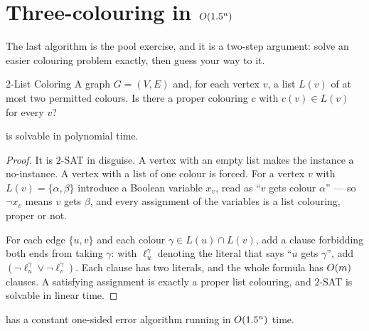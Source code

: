 \section{Three-colouring in \texorpdfstring{$O\!\left(1.5^n\right)$}{O(1.5 to the n)}}
\label{sec:randomized-3col}

The last algorithm is the pool exercise, and it is a two-step argument: solve an
easier colouring problem exactly, then guess your way to it.

\begin{probdef}{2-List Coloring}
  \instance A graph $G = (V,E)$ and, for each vertex $v$, a list
  $L(v)$ of at most two permitted colours.
  \question Is there a proper colouring $c$ with $c(v) \in L(v)$ for every $v$?
\end{probdef}

\begin{proposition}\label{prop:2-list-colouring}
 is solvable in polynomial time.
\end{proposition}

\begin{proof}
It is $2$-SAT in disguise. A vertex with an empty list makes the instance a
no-instance. A vertex with a list of one colour is forced. For a vertex $v$ with
$L(v) = \{\alpha,\beta\}$ introduce a Boolean variable $x_v$, read as ``$v$ gets
colour $\alpha$'' --- so $\neg x_v$ means $v$ gets $\beta$, and every assignment
of the variables is a list colouring, proper or not.

For each edge $\{u,v\}$ and each colour $\gamma \in L(u) \cap L(v)$, add a
clause forbidding both ends from taking $\gamma$: with $\ell_u^\gamma$ denoting
the literal that says ``$u$ gets $\gamma$'', add
$(\neg \ell_u^{\gamma} \vee \neg \ell_v^{\gamma})$. Each clause has two
literals, and the whole formula has $O\!\left(m\right)$ clauses. A satisfying assignment
is exactly a proper list colouring, and $2$-SAT is solvable in linear time.
\end{proof}

\begin{theorem}\label{thm:randomized-3col}
 has a constant one-sided error algorithm running in
$O\!\left(1.5^n\right)$ time.
\end{theorem}

